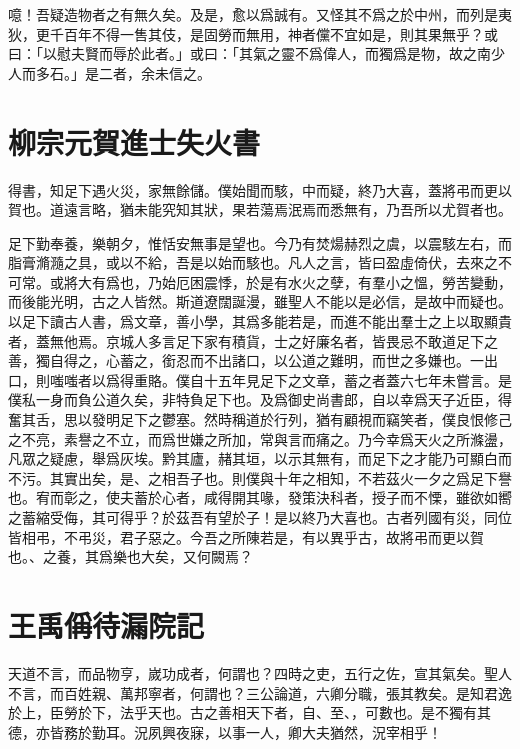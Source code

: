 噫！吾疑造物者之有無久矣。及是，愈以爲誠有。又怪其不爲之於中州，而列是夷狄，更千百年不得一售其伎，是固勞而無用，神者儻不宜如是，則其果無乎？或曰：「以慰夫賢而辱於此者。」或曰：「其氣之靈不爲偉人，而獨爲是物，故之南少人而多石。」是二者，余未信之。

\section[賀進士王參元失火書\quad{\small 柳宗元}]{{\normalsize 柳宗元}\quad 賀進士失火書}
得書，知足下遇火災，家無餘儲。僕始聞而駭，中而疑，終乃大喜，蓋將弔而更以賀也。道遠言略，猶未能究知其狀，果若蕩焉泯焉而悉無有，乃吾所以尤賀者也。

足下勤奉養，樂朝夕，惟恬安無事是望也。今乃有焚煬赫烈之虞，以震駭左右，而脂膏滫瀡之具，或以不給，吾是以始而駭也。凡人之言，皆曰盈虛倚伏，去來之不可常。或將大有爲也，乃始厄困震悸，於是有水火之孽，有羣小之慍，勞苦變動，而後能光明，古之人皆然。斯道遼闊誕漫，雖聖人不能以是必信，是故中而疑也。以足下讀古人書，爲文章，善小學，其爲多能若是，而進不能出羣士之上以取顯貴者，蓋無他焉。京城人多言足下家有積貨，士之好廉名者，皆畏忌不敢道足下之善，獨自得之，心蓄之，銜忍而不出諸口，以公道之難明，而世之多嫌也。一出口，則嗤嗤者以爲得重賂。僕自十五年見足下之文章，蓄之者蓋六七年未嘗言。是僕私一身而負公道久矣，非特負足下也。及爲御史尚書郎，自以幸爲天子近臣，得奮其舌，思以發明足下之鬱塞。然時稱道於行列，猶有顧視而竊笑者，僕良恨修己之不亮，素譽之不立，而爲世嫌之所加，常與言而痛之。乃今幸爲天火之所滌盪，凡眾之疑慮，舉爲灰埃。黔其廬，赭其垣，以示其無有，而足下之才能乃可顯白而不污。其實出矣，是、之相吾子也。則僕與十年之相知，不若茲火一夕之爲足下譽也。宥而彰之，使夫蓄於心者，咸得開其喙，發策決科者，授子而不慄，雖欲如嚮之蓄縮受侮，其可得乎？於茲吾有望於子！是以終乃大喜也。古者列國有災，同位皆相弔，不弔災，君子惡之。今吾之所陳若是，有以異乎古，故將弔而更以賀也。、之養，其爲樂也大矣，又何闕焉？

\section[待漏院記\quad{\small 王禹偁}]{{\normalsize 王禹偁}\quad 待漏院記}
天道不言，而品物亨，嵗功成者，何謂也？四時之吏，五行之佐，宣其氣矣。聖人不言，而百姓親、萬邦寧者，何謂也？三公論道，六卿分職，張其教矣。是知君逸於上，臣勞於下，法乎天也。古之善相天下者，自、至、，可數也。是不獨有其德，亦皆務於勤耳。況夙興夜寐，以事一人，卿大夫猶然，況宰相乎！

